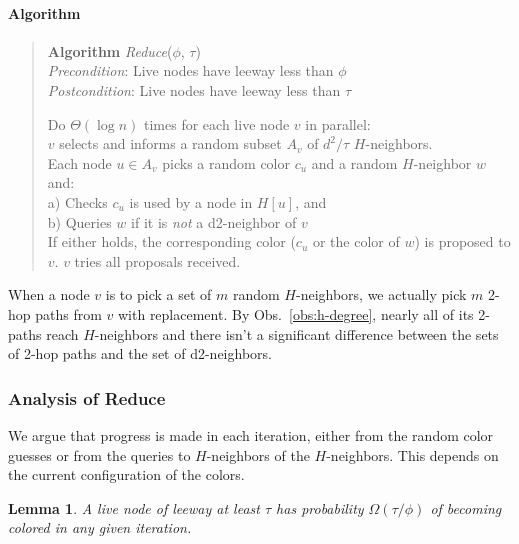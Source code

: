 \documentclass[12pt]{article}
\newtheorem{lemma}[theorem]{Lemma}
\begin{document}
\paragraph*{Algorithm}
%
\begin{quote}
   \textbf{Algorithm} \emph{Reduce}($\phi$, $\tau$) \\
    \emph{Precondition}: Live nodes have leeway less than $\phi$ \\
    \emph{Postcondition}: Live nodes have leeway less than $\tau$

   Do $\Theta(\log n)$ times for each live node $v$ in parallel: \\
\hspace*{2em}    $v$ selects and informs a random subset $A_v$ of $d^2/\tau$ $H$-neighbors. \\
\hspace*{2em}    Each node $u \in A_v$ picks a random color $c_u$ and a random $H$-neighbor $w$ and: \\
\hspace*{4em}    a)  Checks $c_u$ is used by a node in $H[u]$, and \\
\hspace*{4em}    b) Queries $w$ if it is \emph{not} a d2-neighbor of $v$ \\
\hspace*{2em}    If either holds, the corresponding color ($c_u$ or the color of $w$) is proposed to $v$.
\hspace*{2em}    $v$ tries all proposals received.
\end{quote}

When a node $v$ is to pick a set of $m$ random $H$-neighbors, we actually pick $m$ 2-hop paths from $v$ with replacement. By Obs.~\ref{obs:h-degree}, nearly all of its 2-paths reach $H$-neighbors and there isn't a significant difference between the sets of 2-hop paths and the set of d2-neighbors.

\subsubsection{Analysis of Reduce}

We argue that progress is made in each iteration, either from the random color guesses or from the queries to $H$-neighbors of the $H$-neighbors. This depends on the current configuration of the colors.

\begin{lemma}
A live node of leeway at least $\tau$ has probability $\Omega(\tau/\phi)$ of becoming colored in any given iteration.
\label{l:progress}
\end{lemma}
\end{document}
